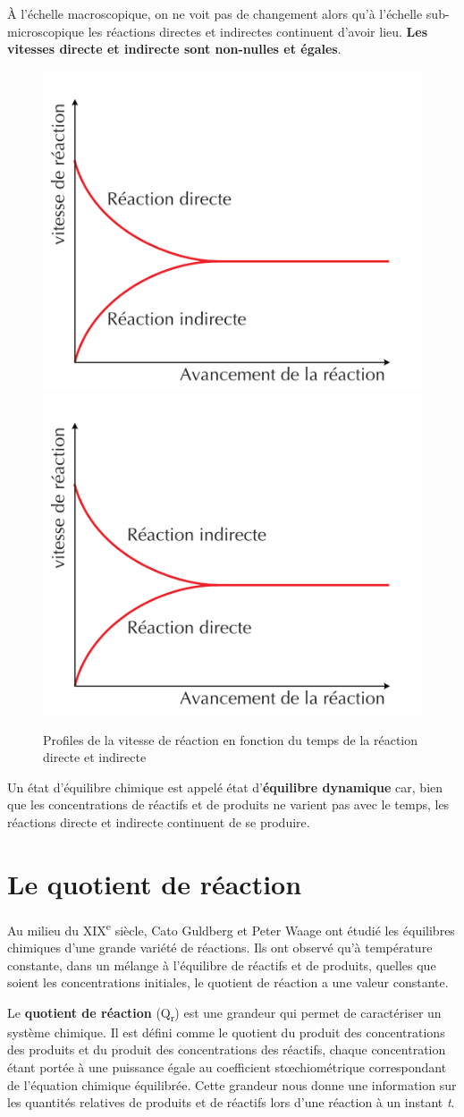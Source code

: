 \documentclass[
  11pt,
  french,
  a4paper,
  openany]{book}
\begin{document}
À l'échelle macroscopique, on ne voit pas de changement alors qu'à l'échelle sub-microscopique les réactions directes et indirectes continuent d'avoir lieu. \textbf{Les vitesses directe et indirecte sont non-nulles et égales}.

\begin{figure}

{\centering \includegraphics[width=0.33\linewidth]{images/equilibres-vitesses-1a} \includegraphics[width=0.33\linewidth]{images/equilibres-vitesses-1b} 

}

\caption{Profiles de la vitesse de réaction en fonction du temps de la réaction directe et indirecte}\label{fig:equilibres-vitesses-1}
\end{figure}

Un état d'équilibre chimique est appelé état d'\textbf{équilibre dynamique} car, bien que les concentrations de réactifs et de produits ne varient pas avec le temps, les réactions directe et indirecte continuent de se produire.

\hypertarget{le-quotient-de-ruxe9action}{%
\section{Le quotient de réaction}\label{le-quotient-de-ruxe9action}}

Au milieu du XIX\textsuperscript{e} siècle, Cato Guldberg et Peter Waage ont étudié les équilibres chimiques d'une grande variété de réactions. Ils ont observé qu'à température constante, dans un mélange à l'équilibre de réactifs et de produits, quelles que soient les concentrations initiales, le quotient de réaction a une valeur constante.

Le \textbf{quotient de réaction} (Q\textsubscript{r}) est une grandeur qui permet de caractériser un système chimique. Il est défini comme le quotient du produit des concentrations des produits et du produit des concentrations des réactifs, chaque concentration étant portée à une puissance égale au coefficient stœchiométrique correspondant de l'équation chimique équilibrée. Cette grandeur nous donne une information sur les quantités relatives de produits et de réactifs lors d'une réaction à un instant \emph{t}.
\end{document}
